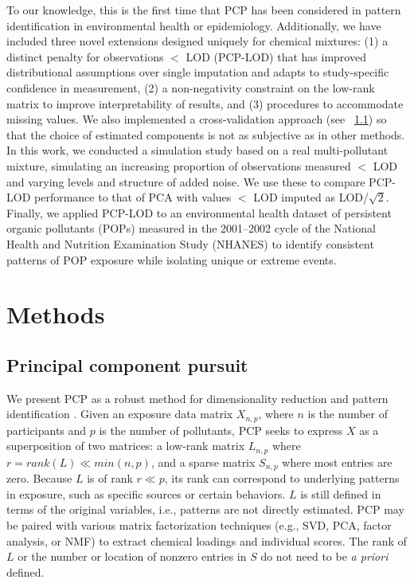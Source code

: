 To our knowledge, this is the first time that PCP has been considered in pattern identification in environmental health or epidemiology. Additionally, we have included three novel extensions designed uniquely for chemical mixtures: (1) a distinct penalty for observations $<$ LOD (PCP-LOD) that has improved distributional assumptions over single imputation and adapts to study-specific confidence in measurement, (2) a non-negativity constraint on the low-rank matrix to improve interpretability of results, and (3) procedures to accommodate missing values. We also implemented a cross-validation approach (see ~\ref{methods:stat}) so that the choice of estimated components is not as subjective as in other methods. In this work, we conducted a simulation study based on a real multi-pollutant mixture, simulating an increasing proportion of observations measured $<$ LOD and varying levels and structure of added noise. We use these to compare PCP-LOD performance to that of PCA with values $<$ LOD imputed as LOD/$\sqrt{2}$. Finally, we applied PCP-LOD to an environmental health dataset of persistent organic pollutants (POPs) measured in the 2001--2002 cycle of the National Health and Nutrition Examination Study (NHANES) to identify consistent patterns of POP exposure while isolating unique or extreme events.

\section{Methods}

\subsection{Principal component pursuit}
\label{methods:stat}
We present PCP as a robust method for dimensionality reduction and pattern identification \citep{candes2011robust}. Given an exposure data matrix $X_{n,p}$, where $n$ is the number of participants and $p$ is the number of pollutants, PCP seeks to express $X$ as a superposition of two matrices: a low-rank matrix $L_{n,p}$ where $r = rank(L) \ll min(n,p)$, and a sparse matrix $S_{n,p}$ where most entries are zero. Because $L$ is of rank $r \ll p$, its rank can correspond to underlying patterns in exposure, such as specific sources or certain behaviors. $L$ is still defined in terms of the original variables, i.e., patterns are not directly estimated. PCP may be paired with various matrix factorization techniques (e.g., SVD, PCA, factor analysis, or NMF) to extract chemical loadings and individual scores. The rank of $L$ or the number or location of nonzero entries in $S$ do not need to be \textit{a priori} defined.

